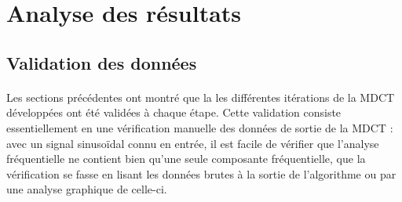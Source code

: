 \documentclass{article}
\begin{document}
    \newpage
    \section{Analyse des résultats}
    \subsection{Validation des données}
    \label{sec:validation}




    \paragraph{}
    Les sections précédentes ont montré que la les différentes itérations de la MDCT développées ont été validées à chaque étape. Cette validation consiste essentiellement en une vérification manuelle des données de sortie de la MDCT : avec un signal sinusoïdal connu en entrée, il est facile de vérifier que l'analyse fréquentielle ne contient bien qu'une seule composante fréquentielle, que la vérification se fasse en lisant les données brutes à la sortie de l'algorithme ou par une analyse graphique de celle-ci.

\end{document}

